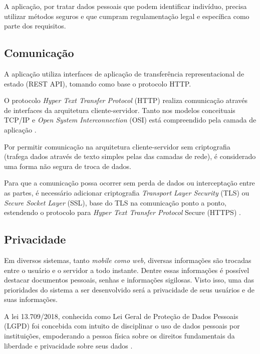 \documentclass[
    12pt,               %
    openright,          %
    oneside,
    a4paper,            %
    BIBLATEX,           %
    TODO,               %
    english,            %
    brazil              %
    ]{ifsp-spo-inf-ctds}
\begin{document}
        A aplicação, por tratar dados pessoais que podem identificar indivíduo, precisa utilizar métodos seguros e que cumpram regulamentação legal e específica como parte dos requisitos.

        \subsection{Comunicação}
        
            A aplicação utiliza interfaces de aplicação de transferência representacional de estado (REST API), tomando como base o protocolo HTTP.
        
            O protocolo \emph{Hyper Text Transfer Protocol} (HTTP) realiza comunicação através de interfaces da arquitetura cliente-servidor. Tanto nos modelos conceituais TCP/IP e \emph{Open System Interconnection} (OSI) está compreendido pela camada de aplicação .
        
            Por permitir comunicação na arquitetura cliente-servidor sem criptografia (trafega dados através de texto simples pelas das camadas de rede), é considerado uma forma não segura de troca de dados.
            
            Para que a comunicação possa ocorrer sem perda de dados ou interceptação entre as partes, é necessário adicionar criptografia \emph{Transport Layer Security} (TLS) ou \emph{Secure Socket Layer} (SSL), base do TLS na comunicação ponto a ponto, estendendo o protocolo para \emph{Hyper Text Transfer Protocol} Secure (HTTPS) .

        \subsection{Privacidade}
        
            Em diversos sistemas, tanto \emph{mobile como web,} diversas informações são trocadas entre o usuário e o servidor a todo instante. Dentre essas informações é possível destacar documentos pessoais, senhas e informações sigilosas. Visto isso, uma das prioridades do sistema a ser desenvolvido será a privacidade de seus usuários e de suas informações.
        
            A lei 13.709/2018, conhecida como Lei Geral de Proteção de Dados Pessoais (LGPD) foi concebida com intuito de disciplinar o uso de dados pessoais por instituições, empoderando a pessoa física sobre os direitos fundamentais da liberdade e privacidade sobre seus dados .
            
\end{document}
